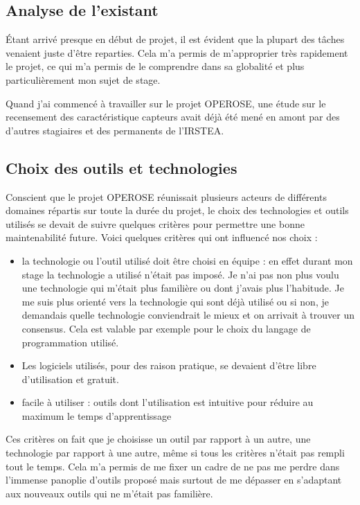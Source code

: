 \subsection{Analyse de l’existant} 
Étant arrivé presque en début de projet, il est évident que la plupart des tâches venaient juste d’être reparties. Cela m’a permis de m’approprier très rapidement le projet, ce qui m’a permis de le comprendre dans sa globalité et plus particulièrement mon sujet de stage.   

Quand j’ai commencé à travailler sur le projet OPEROSE, une étude sur le recensement des caractéristique capteurs avait déjà été mené en amont par des d’autres stagiaires et des permanents de l’IRSTEA. 

\subsection{Choix des outils et technologies}

Conscient que le projet OPEROSE réunissait plusieurs acteurs de différents domaines répartis sur toute la durée du projet, le choix des technologies et outils utilisés se devait de suivre quelques critères pour permettre une bonne maintenabilité future. Voici quelques critères qui ont influencé nos choix : 
\begin{itemize}
 

  \item la technologie ou l’outil utilisé doit être choisi en équipe : en effet durant mon stage la technologie a utilisé n’était pas imposé. Je n’ai pas non plus voulu une technologie qui m’était plus familière ou dont j’avais plus l’habitude. Je me suis plus orienté vers la technologie qui sont déjà utilisé ou si non, je demandais quelle technologie conviendrait le mieux et on arrivait à trouver un consensus. Cela est valable par exemple pour le choix du langage de programmation utilisé. 

  \item Les logiciels utilisés, pour des raison pratique, se devaient d’être libre d’utilisation et gratuit. 

   \item facile à utiliser : outils dont l’utilisation est intuitive pour réduire au maximum le temps d’apprentissage 
\end{itemize}
Ces critères on fait que je choisisse un outil par rapport à un autre, une technologie par rapport à une autre, même si tous les critères n’était pas rempli tout le temps. Cela m’a permis de me fixer un cadre de ne pas me perdre dans l’immense panoplie d’outils proposé mais surtout de me dépasser en s’adaptant aux nouveaux outils qui ne m'était pas familière. 

